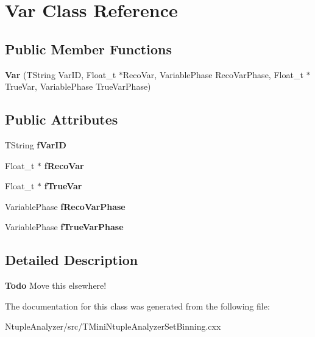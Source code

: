 \section{Var Class Reference}
\label{classVar}
\subsection*{Public Member Functions}
\begin{CompactItemize}
\item 
\textbf{Var} (TString Var\-ID, Float\_\-t $\ast$Reco\-Var, Variable\-Phase Reco\-Var\-Phase, Float\_\-t $\ast$True\-Var, Variable\-Phase True\-Var\-Phase)\label{classVar_7c9bb4dc779c465d5fc778546c09c4d0}

\end{CompactItemize}
\subsection*{Public Attributes}
\begin{CompactItemize}
\item 
TString \textbf{f\-Var\-ID}\label{classVar_38ac54e4830cc316aebaece56e45152d}

\item 
Float\_\-t $\ast$ \textbf{f\-Reco\-Var}\label{classVar_fc5a6113b53787311f306f45a297b9f7}

\item 
Float\_\-t $\ast$ \textbf{f\-True\-Var}\label{classVar_23c7f391b68d34402f7b2dd359c0e813}

\item 
Variable\-Phase \textbf{f\-Reco\-Var\-Phase}\label{classVar_9667365579b8665e30ce061ab968b52d}

\item 
Variable\-Phase \textbf{f\-True\-Var\-Phase}\label{classVar_61c98149cfce34b77a57206577963d43}

\end{CompactItemize}


\subsection{Detailed Description}
\begin{Desc}
\item[\bf{Todo}]Move this elsewhere! \end{Desc}




The documentation for this class was generated from the following file:\begin{CompactItemize}
\item 
Ntuple\-Analyzer/src/TMini\-Ntuple\-Analyzer\-Set\-Binning.cxx\end{CompactItemize}
